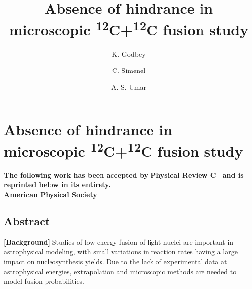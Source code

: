 
\chapter{Absence of hindrance in microscopic \textsuperscript{12}C+\textsuperscript{12}C fusion study}\label{chapters:chapter_6}

\title{Absence of hindrance in microscopic \textsuperscript{12}C+\textsuperscript{12}C fusion study}

\author[1]{K. Godbey}



\author[2]{C. Simenel}

\author[1]{A. S. Umar}

{
	\bfseries\centering
	The following work has been accepted by Physical Review C~\citep{godbey2019b} and is reprinted below in its entirety.\\
	 American Physical Society
	\makeatletter
	\begin{center}\large\bfseries
		\@title
		\par\end{center}
	\begin{center}
		\AB@authlist
		\AB@affillist
	\end{center}
	\makeatother
}
\makeatletter
\renewcommand{\AB@affillist}{}
\renewcommand{\AB@authlist}{}
\setcounter{authors}{0}
\makeatother

\section*{Abstract}
	\edef\oldrightskip{\the\rightskip}

		\rightskip\oldrightskip\relax
		\setlength{\parskip}{0pt}
		
		{\bf [Background]} Studies of low-energy fusion of light nuclei are important in astrophysical modeling, with small variations in reaction rates having a large impact on nucleosynthesis yields. Due to the lack of experimental data at astrophysical energies, extrapolation and microscopic methods are needed to model fusion probabilities.
		
